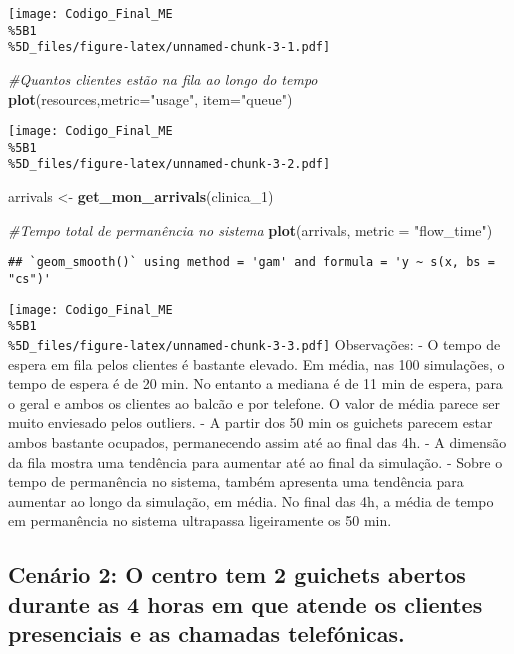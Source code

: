 \documentclass[
]{article}
\newenvironment{Shaded}{\begin{snugshade}}{\end{snugshade}}
\newcommand{\AttributeTok}[1]{\textcolor[rgb]{0.13,0.29,0.53}{#1}}
\newcommand{\CommentTok}[1]{\textcolor[rgb]{0.56,0.35,0.01}{\textit{#1}}}
\newcommand{\FunctionTok}[1]{\textcolor[rgb]{0.13,0.29,0.53}{\textbf{#1}}}
\newcommand{\NormalTok}[1]{#1}
\newcommand{\OtherTok}[1]{\textcolor[rgb]{0.56,0.35,0.01}{#1}}
\newcommand{\StringTok}[1]{\textcolor[rgb]{0.31,0.60,0.02}{#1}}
\begin{document}
\texttt{[image: Codigo\_Final\_ME\\\%5B1\\\%5D\_files/figure-latex/unnamed-chunk-3-1.pdf]}

\begin{Shaded}
\begin{Highlighting}[]
\CommentTok{\#Quantos clientes estão na fila ao longo do tempo}
\FunctionTok{plot}\NormalTok{(resources,}\AttributeTok{metric=}\StringTok{"usage"}\NormalTok{, }\AttributeTok{item=}\StringTok{"queue"}\NormalTok{)}
\end{Highlighting}
\end{Shaded}

\texttt{[image: Codigo\_Final\_ME\\\%5B1\\\%5D\_files/figure-latex/unnamed-chunk-3-2.pdf]}

\begin{Shaded}
\begin{Highlighting}[]
\NormalTok{arrivals }\OtherTok{\textless{}{-}} \FunctionTok{get\_mon\_arrivals}\NormalTok{(clinica\_1)}

\CommentTok{\#Tempo total de permanência no sistema }
\FunctionTok{plot}\NormalTok{(arrivals, }\AttributeTok{metric =} \StringTok{"flow\_time"}\NormalTok{)   }
\end{Highlighting}
\end{Shaded}

\begin{verbatim}
## `geom_smooth()` using method = 'gam' and formula = 'y ~ s(x, bs = "cs")'
\end{verbatim}

\texttt{[image: Codigo\_Final\_ME\\\%5B1\\\%5D\_files/figure-latex/unnamed-chunk-3-3.pdf]}
Observações: - O tempo de espera em fila pelos clientes é bastante
elevado. Em média, nas 100 simulações, o tempo de espera é de 20 min. No
entanto a mediana é de 11 min de espera, para o geral e ambos os
clientes ao balcão e por telefone. O valor de média parece ser muito
enviesado pelos outliers. - A partir dos 50 min os guichets parecem
estar ambos bastante ocupados, permanecendo assim até ao final das 4h. -
A dimensão da fila mostra uma tendência para aumentar até ao final da
simulação. - Sobre o tempo de permanência no sistema, também apresenta
uma tendência para aumentar ao longo da simulação, em média. No final
das 4h, a média de tempo em permanência no sistema ultrapassa
ligeiramente os 50 min.

\subsection{Cenário 2: O centro tem 2 guichets abertos durante as 4
horas em que atende os clientes presenciais e as chamadas
telefónicas.}\label{cenuxe1rio-2-o-centro-tem-2-guichets-abertos-durante-as-4-horas-em-que-atende-os-clientes-presenciais-e-as-chamadas-telefuxf3nicas.}
\end{document}

